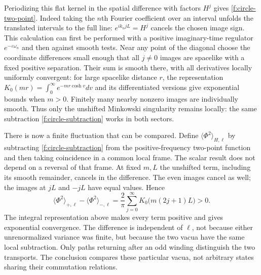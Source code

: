 Periodizing this flat kernel in the spatial difference with factors $H^j$ gives \eqref{f:circle-two-point}. Indeed taking the $n$th Fourier coefficient over an interval unfolds the translated intervals to the full line: $e^{ik_n jL}=H^j$ cancels the chosen image sign. This calculation can first be performed with a positive imaginary-time regulator $e^{-\varepsilon\omega_n}$ and then against smooth tests. Near any point of the diagonal choose the coordinate differences small enough that all $j\ne0$ images are spacelike with a fixed positive separation. Their sum is smooth there, with all derivatives locally uniformly convergent: for large spacelike distance $r$, the representation $K_0(mr)=\int_0^\infty e^{-mr\cosh v}dv$ and its differentiated versions give exponential bounds when $m>0$. Finitely many nearby nonzero images are individually smooth. Thus only the unshifted Minkowski singularity remains locally: the same subtraction \eqref{f:circle-subtraction} works in both sectors.

There is now a finite fluctuation that can be compared. Define $\langle\Phi^2\rangle_{H,\ell}$ by subtracting \eqref{f:circle-subtraction} from the positive-frequency two-point function and then taking coincidence in a common local frame. The scalar result does not depend on a reversal of that frame. At fixed $m,L$ the unshifted term, including its smooth remainder, cancels in the difference. The even images cancel as well; the images at $jL$ and $-jL$ have equal values. Hence
\begin{equation}
 \langle\Phi^2\rangle_{+,\ell}-\langle\Phi^2\rangle_{-,\ell}
   =\frac{2}{\pi}\sum_{j=0}^\infty K_0\big(m(2j+1)L\big)>0 .\label{f:relative-fluctuation}
\end{equation}
The integral representation above makes every term positive and gives exponential convergence. The difference is independent of $\ell$, not because either unrenormalized variance was finite, but because the two vacua have the same local subtraction. Only paths returning after an odd winding distinguish the two transports. The conclusion compares these particular vacua, not arbitrary states sharing their commutation relations.

\Needspace{.52\textheight}
